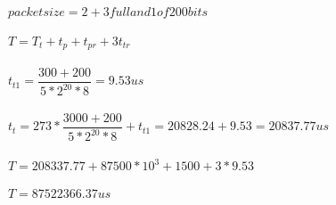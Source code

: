 \documentclass[a4paper,12pt]{article}
\begin{document}
$ packet size =2+3 full and 1 of 200 bits $\\\\
$ T=T_{t}+t_{p}+t_{pr}+3t_{tr}$\\\\
$ t_{t1}=\dfrac{300+200}{5*2^{20}*8}=9.53 us $\\\\
$ t_{t}=273*\dfrac{3000+200}{5*2^{20}*8}+t_{t1}=20828.24+9.53=20837.77 us $\\\\
$ T = 208337.77+87500*10^{3}+1500+3*9.53 $\\\\
$ T = 87522366.37 us $\\\\



















 
\end{document}
